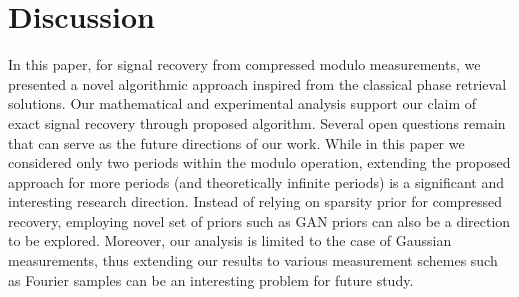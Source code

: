 \section{Discussion}
\label{sec:disc}
In this paper, for signal recovery from compressed modulo measurements, we presented a novel algorithmic approach inspired from the classical phase retrieval solutions. Our mathematical and experimental analysis support our claim of exact signal recovery through proposed algorithm. Several open questions remain that can serve as the future directions of our work. While in this paper we considered only two periods within the modulo operation, extending the proposed approach for more periods (and theoretically infinite periods) is a significant and interesting research direction. Instead of relying on sparsity prior for compressed recovery, employing novel set of priors such as GAN priors\cite{bora2017compressed,shah2018solving} can also be a direction to be explored. Moreover, our analysis is limited to the case of Gaussian measurements, thus extending our results to various measurement schemes such as Fourier samples can be an interesting problem for future study.
